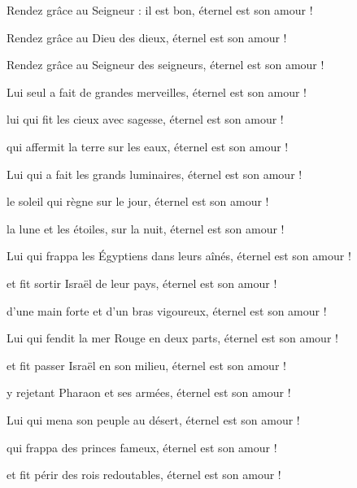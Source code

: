 \item Rendez grâce au Seigneur : il est bon, éternel est son amour !

\item Rendez grâce au Dieu des dieux, éternel est son amour !

\item Rendez grâce au Seigneur des seigneurs, éternel est son amour !

\item Lui seul a fait de grandes merveilles, éternel est son amour !

\item lui qui fit les cieux avec sagesse, éternel est son amour !

\item qui affermit la terre sur les eaux, éternel est son amour !

\item Lui qui a fait les grands luminaires, éternel est son amour !

\item le soleil qui règne sur le jour, éternel est son amour !

\item la lune et les étoiles, sur la nuit, éternel est son amour !

\item Lui qui frappa les Égyptiens dans leurs aînés, éternel est son amour !

\item et fit sortir Israël de leur pays, éternel est son amour !

\item d'une main forte et d'un bras vigoureux, éternel est son amour !

\item Lui qui fendit la mer Rouge en deux parts, éternel est son amour !

\item et fit passer Israël en son milieu, éternel est son amour !

\item y rejetant Pharaon et ses armées, éternel est son amour !

\item Lui qui mena son peuple au désert, éternel est son amour !

\item qui frappa des princes fameux, éternel est son amour !

\item et fit périr des rois redoutables, éternel est son amour !

